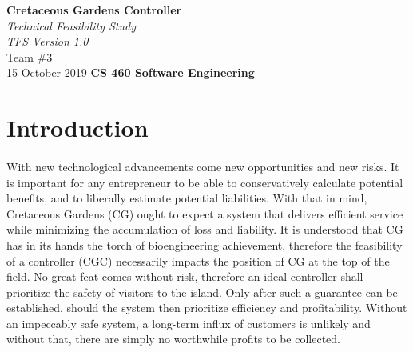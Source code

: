 \documentclass[12pt]{article}
\begin{document}
\begin{titlepage}
	\begin{flushleft}
		\vspace{1cm} \Huge  \textbf{Cretaceous Gardens Controller}\\
		\vspace{1cm} \Huge  \textit{Technical Feasibility Study}\\
		\vspace{1cm} \Large \textit{TFS Version 1.0}\\
		\vspace{5cm} \LARGE         Team \#3\\ 
		                            15 October 2019
		\vfill       \Huge  \textbf{CS 460 Software Engineering}
	\end{flushleft}
\end{titlepage}
\normalsize 
\tableofcontents
\pagebreak

\section{Introduction}
\paragraph{} With new technological advancements come new opportunities and new risks. It 
 is important for any entrepreneur to be able to conservatively calculate potential benefits, and 
 to liberally estimate potential liabilities. With that in mind, Cretaceous Gardens (CG) ought to 
 expect a system that delivers efficient service while minimizing the accumulation of loss and liability. 
 It is understood that CG has in its hands the torch of bioengineering achievement, therefore the
 feasibility of a controller (CGC) necessarily impacts the position of CG at the top of the field.
 No great feat comes without risk, therefore an ideal controller shall prioritize the safety of
 visitors to the island. Only after such a guarantee can be established, should the system then
 prioritize efficiency and profitability. Without an impeccably safe system, a long-term influx 
 of customers is unlikely and without that, there are simply no worthwhile profits to be collected.
 
\end{document}
